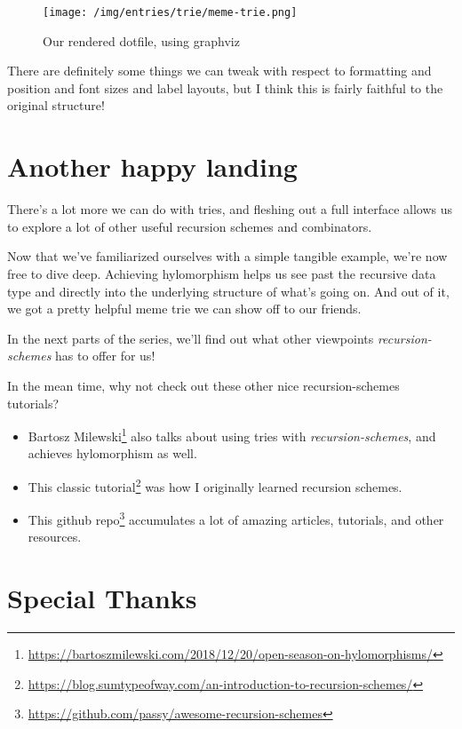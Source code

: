 \documentclass[]{article}
\renewcommand{\href}[2]{#2\footnote{\url{#1}}}
\begin{document}
\begin{figure}
\centering
\texttt{[image: /img/entries/trie/meme-trie.png]}
\caption{Our rendered dotfile, using graphviz}
\end{figure}

There are definitely some things we can tweak with respect to formatting and
position and font sizes and label layouts, but I think this is fairly faithful
to the original structure!

\section{Another happy landing}\label{another-happy-landing}

There's a lot more we can do with tries, and fleshing out a full interface
allows us to explore a lot of other useful recursion schemes and combinators.

Now that we've familiarized ourselves with a simple tangible example, we're now
free to dive deep. Achieving hylomorphism helps us see past the recursive data
type and directly into the underlying structure of what's going on. And out of
it, we got a pretty helpful meme trie we can show off to our friends.

In the next parts of the series, we'll find out what other viewpoints
\emph{recursion-schemes} has to offer for us!

In the mean time, why not check out these other nice recursion-schemes
tutorials?

\begin{itemize}
\tightlist
\item
  \href{https://bartoszmilewski.com/2018/12/20/open-season-on-hylomorphisms/}{Bartosz
  Milewski} also talks about using tries with \emph{recursion-schemes}, and
  achieves hylomorphism as well.
\item
  \href{https://blog.sumtypeofway.com/an-introduction-to-recursion-schemes/}{This
  classic tutorial} was how I originally learned recursion schemes.
\item
  \href{https://github.com/passy/awesome-recursion-schemes}{This github repo}
  accumulates a lot of amazing articles, tutorials, and other resources.
\end{itemize}

\section{Special Thanks}\label{special-thanks}
\end{document}
